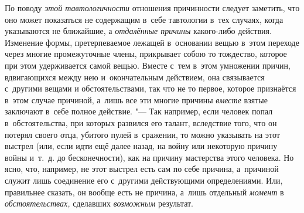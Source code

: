 По поводу {\em этой тавтологичности} отношения причинности следует заметить,
что оно может показаться не содержащим в~себе тавтологии в~тех случаях, когда
указываются не ближайшие, а {\em отдалённые причины} какого-либо действия.
Изменение формы, претерпеваемое лежащей в~основании вещью в~этом переходе через
многие промежуточные члены, прикрывает собою то тождество, которое при этом
удерживается самой вещью. Вместе с~тем в~этом умножении причин, вдвигающихся
между нею и~окончательным действием, она связывается с~другими вещами и
обстоятельствами, так что не то первое, которое признаётся в~этом случае
причиной, а~лишь все эти многие причины {\em вместе} взятые заключают в~себе
полное действие. "--- Так например, если человек попал в~обстоятельства, при
которых развился его талант, вследствие того, что он потерял своего отца,
убитого пулей в~сражении, то можно указывать на этот выстрел (или, если идти
ещё далее назад, на войну или некоторую причину войны и~т.~д. до
бесконечности), как на причину мастерства этого человека. Но ясно, что,
например, не этот выстрел есть сам по себе причина, а~причиной служит лишь
соединение его с~другими действующими определениями. Или, правильнее сказать,
он вообще есть не причина, а~лишь отдельный {\em момент} в~{\em
обстоятельствах,} сделавших {\em возможным} результат.

